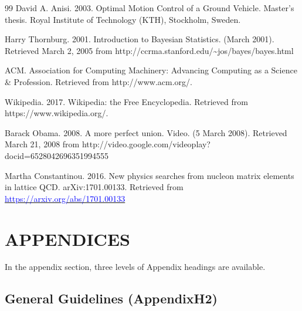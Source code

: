 \documentclass[conference]{IEEEtran}
\begin{document}
\begin{thebibliography}{99}
 David A. Anisi. 2003. Optimal Motion Control of a Ground Vehicle. Master's thesis. Royal Institute of Technology (KTH), Stockholm, Sweden.

 Harry Thornburg. 2001. Introduction to Bayesian Statistics. (March 2001). Retrieved March 2, 2005 from http://ccrma.stanford.edu/\textasciitilde{}jos/bayes/bayes.html

 ACM. Association for Computing Machinery: Advancing Computing as a Science \& Profession. Retrieved from http://www.acm.org/.

 Wikipedia. 2017. Wikipedia: the Free Encyclopedia. Retrieved from https://www.wikipedia.org/.

 Barack Obama. 2008. A more perfect union. Video. (5 March 2008). Retrieved March 21, 2008 from http://video.google.com/videoplay?docid=6528042696351994555

 Martha Constantinou. 2016. New physics searches from nucleon matrix elements in lattice QCD.  arXiv:1701.00133. Retrieved from \href{https://arxiv.org/abs/1701.00133}{\textcolor{blue}{https://arxiv.org/abs/1701.00133}}

\end{thebibliography}

\section{APPENDICES}

In the appendix section, three levels of Appendix headings are available.

\subsection{General Guidelines (AppendixH2)}
\end{document}
